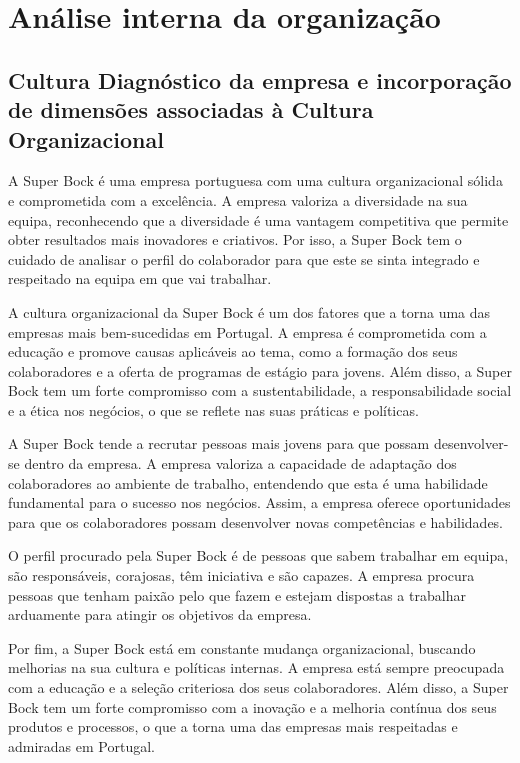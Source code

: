 \chapter{Análise interna da organização}
\label{Chapter2} %

\section{Cultura Diagnóstico da empresa e incorporação de dimensões associadas à Cultura Organizacional}

A Super Bock é uma empresa portuguesa com uma cultura organizacional sólida e comprometida com a excelência. A empresa valoriza a diversidade na sua equipa, reconhecendo que a diversidade é uma vantagem competitiva que permite obter resultados mais inovadores e criativos. Por isso, a Super Bock tem o cuidado de analisar o perfil do colaborador para que este se sinta integrado e respeitado na equipa em que vai trabalhar.

A cultura organizacional da Super Bock é um dos fatores que a torna uma das empresas mais bem-sucedidas em Portugal. A empresa é comprometida com a educação e promove causas aplicáveis ao tema, como a formação dos seus colaboradores e a oferta de programas de estágio para jovens. Além disso, a Super Bock tem um forte compromisso com a sustentabilidade, a responsabilidade social e a ética nos negócios, o que se reflete nas suas práticas e políticas.

A Super Bock tende a recrutar pessoas mais jovens para que possam desenvolver-se dentro da empresa. A empresa valoriza a capacidade de adaptação dos colaboradores ao ambiente de trabalho, entendendo que esta é uma habilidade fundamental para o sucesso nos negócios. Assim, a empresa oferece oportunidades para que os colaboradores possam desenvolver novas competências e habilidades.

O perfil procurado pela Super Bock é de pessoas que sabem trabalhar em equipa, são responsáveis, corajosas, têm iniciativa e são capazes. A empresa procura pessoas que tenham paixão pelo que fazem e estejam dispostas a trabalhar arduamente para atingir os objetivos da empresa.

Por fim, a Super Bock está em constante mudança organizacional, buscando melhorias na sua cultura e políticas internas. A empresa está sempre preocupada com a educação e a seleção criteriosa dos seus colaboradores. Além disso, a Super Bock tem um forte compromisso com a inovação e a melhoria contínua dos seus produtos e processos, o que a torna uma das empresas mais respeitadas e admiradas em Portugal. 


